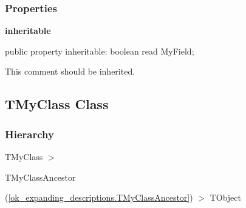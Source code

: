 \documentclass{report}
\newif\ifpdf
\begin{document}
\subsubsection*{\large{\textbf{Properties}}\normalsize\hspace{1ex}\hfill}
\begin{list}{}{
\setlength{\itemindent}{0cm}
\setlength{\listparindent}{0cm}
\setlength{\leftmargin}{\evensidemargin}
\addtolength{\leftmargin}{\tmplength}
\settowidth{\labelsep}{X}
\addtolength{\leftmargin}{\labelsep}
\setlength{\labelwidth}{\tmplength}
}
\label{ok_expanding_descriptions.TMyClassAncestor-inheritable}
\item[\textbf{inheritable}\hfill]
\ifpdf
\begin{flushleft}
\fi
\begin{ttfamily}
public property inheritable: boolean read MyField;\end{ttfamily}

\ifpdf
\end{flushleft}
\fi


\par This comment should be inherited.\end{list}
\ifpdf
\subsection*{\large{\textbf{TMyClass Class}}\normalsize\hspace{1ex}\hrulefill}
\else
\subsection*{TMyClass Class}
\fi
\label{ok_expanding_descriptions.TMyClass}
\subsubsection*{\large{\textbf{Hierarchy}}\normalsize\hspace{1ex}\hfill}
TMyClass {$>$} \begin{ttfamily}TMyClassAncestor\end{ttfamily}(\ref{ok_expanding_descriptions.TMyClassAncestor}) {$>$} 
TObject
\end{document}
